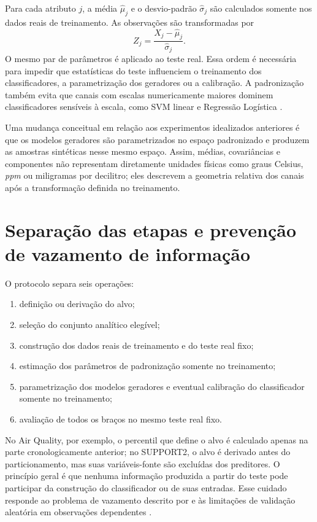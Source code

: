 Para cada atributo $j$, a média $\widehat{\mu}_j$ e o desvio-padrão $\widehat{\sigma}_j$ são calculados somente nos dados reais de treinamento. As observações são transformadas por
\begin{equation}
  Z_j=\frac{X_j-\widehat{\mu}_j}{\widehat{\sigma}_j}.
  \label{eq:zscore}
\end{equation}
O mesmo par de parâmetros é aplicado ao teste real. Essa ordem é necessária para impedir que estatísticas do teste influenciem o treinamento dos classificadores, a parametrização dos geradores ou a calibração. A padronização também evita que canais com escalas numericamente maiores dominem classificadores sensíveis à escala, como SVM linear e Regressão Logística \cite{pedregosa2011}.

Uma mudança conceitual em relação aos experimentos idealizados anteriores é que os modelos geradores são parametrizados no espaço padronizado e produzem as amostras sintéticas nesse mesmo espaço. Assim, médias, covariâncias e componentes não representam diretamente unidades físicas como graus Celsius, \textit{ppm} ou miligramas por decilitro; eles descrevem a geometria relativa dos canais após a transformação definida no treinamento.

\section{Separação das etapas e prevenção de vazamento de informação}

O protocolo separa seis operações:

\begin{enumerate}
  \item definição ou derivação do alvo;
  \item seleção do conjunto analítico elegível;
  \item construção dos dados reais de treinamento e do teste real fixo;
  \item estimação dos parâmetros de padronização somente no treinamento;
  \item parametrização dos modelos geradores e eventual calibração do classificador somente no treinamento;
  \item avaliação de todos os braços no mesmo teste real fixo.
\end{enumerate}

No Air Quality, por exemplo, o percentil que define o alvo é calculado apenas na parte cronologicamente anterior; no SUPPORT2, o alvo é derivado antes do particionamento, mas suas variáveis-fonte são excluídas dos preditores. O princípio geral é que nenhuma informação produzida a partir do teste pode participar da construção do classificador ou de suas entradas. Esse cuidado responde ao problema de vazamento descrito por \textcite{Kaufman2012} e às limitações de validação aleatória em observações dependentes \cite{Roberts2017,Bergmeir2012}.

